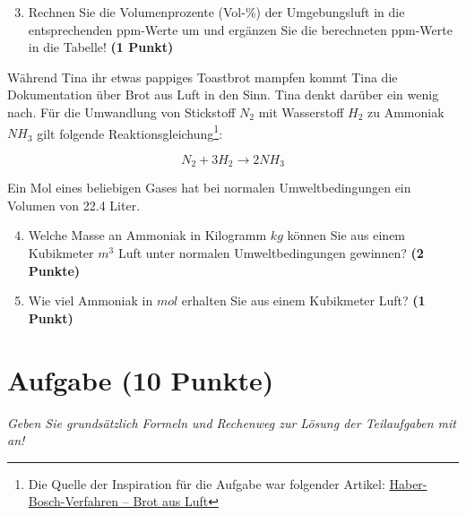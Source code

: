 \documentclass[a4paper, 9pt]{scrartcl}\usepackage[]{graphicx}\usepackage[]{xcolor}
\begin{document}
\begin{enumerate}
   \setcounter{enumi}{2}
\item Rechnen Sie die Volumenprozente (Vol-\%) der Umgebungsluft in die entsprechenden ppm-Werte um und ergänzen Sie die berechneten ppm-Werte in die Tabelle!  \textbf{(1 Punkt)}
\end{enumerate}

Während Tina ihr etwas pappiges Toastbrot mampfen kommt Tina die Dokumentation über Brot aus Luft in den Sinn. Tina denkt darüber ein wenig nach. Für die Umwandlung von Stickstoff $N_2$ mit Wasserstoff $H_2$ zu Ammoniak $NH_3$ gilt folgende Reaktionsgleichung\footnote{Die Quelle der Inspiration für die Aufgabe war folgender Artikel: \href{https://www.gdch.de/netzwerk-strukturen/fachstrukturen/ag-chemie-und-gesellschaft/projekte-und-veranstaltungen/cartoons/haber-bosch-verfahren-brot-aus-luft.html}{Haber-Bosch-Verfahren – Brot aus Luft}}:

\begin{equation*}
  N_2 + 3H_2 \rightarrow 2NH_3
\end{equation*}  

Ein Mol eines beliebigen Gases hat bei normalen Umweltbedingungen ein Volumen von 22.4 Liter. %

\begin{enumerate}
  \setcounter{enumi}{3}
\item Welche Masse an Ammoniak in Kilogramm $kg$ können Sie aus einem Kubikmeter $m^3$ Luft unter normalen Umweltbedingungen gewinnen?
  \textbf{(2 Punkte)}
\item Wie viel Ammoniak in $mol$ erhalten Sie aus einem Kubikmeter Luft? \textbf{(1 Punkt)}
\end{enumerate}

 
\clearpage

\section{Aufgabe \hfill (10 Punkte)}

\textit{Geben Sie grundsätzlich Formeln und Rechenweg zur Lösung der Teilaufgaben mit an!} \\[1Ex]
 
\end{document}
